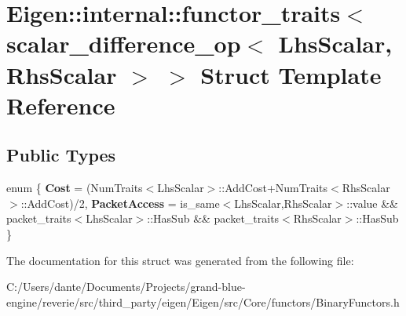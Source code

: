 \hypertarget{struct_eigen_1_1internal_1_1functor__traits_3_01scalar__difference__op_3_01_lhs_scalar_00_01_rhs_scalar_01_4_01_4}{}\section{Eigen\+::internal\+::functor\+\_\+traits$<$ scalar\+\_\+difference\+\_\+op$<$ Lhs\+Scalar, Rhs\+Scalar $>$ $>$ Struct Template Reference}
\label{struct_eigen_1_1internal_1_1functor__traits_3_01scalar__difference__op_3_01_lhs_scalar_00_01_rhs_scalar_01_4_01_4}
\subsection*{Public Types}
\begin{DoxyCompactItemize}
\item 
\mbox{\label{struct_eigen_1_1internal_1_1functor__traits_3_01scalar__difference__op_3_01_lhs_scalar_00_01_rhs_scalar_01_4_01_4_a29b7146a0144d1652c4e7439795f653a}} 
enum \{ {\bfseries Cost} = (Num\+Traits$<$Lhs\+Scalar$>$\+::Add\+Cost+\+Num\+Traits$<$Rhs\+Scalar$>$\+::Add\+Cost)/2, 
{\bfseries Packet\+Access} = is\+\_\+same$<$Lhs\+Scalar,Rhs\+Scalar$>$\+::value \&\& packet\+\_\+traits$<$Lhs\+Scalar$>$\+::Has\+Sub \&\& packet\+\_\+traits$<$Rhs\+Scalar$>$\+::Has\+Sub
 \}
\end{DoxyCompactItemize}


The documentation for this struct was generated from the following file\+:\begin{DoxyCompactItemize}
\item 
C\+:/\+Users/dante/\+Documents/\+Projects/grand-\/blue-\/engine/reverie/src/third\+\_\+party/eigen/\+Eigen/src/\+Core/functors/Binary\+Functors.\+h\end{DoxyCompactItemize}
